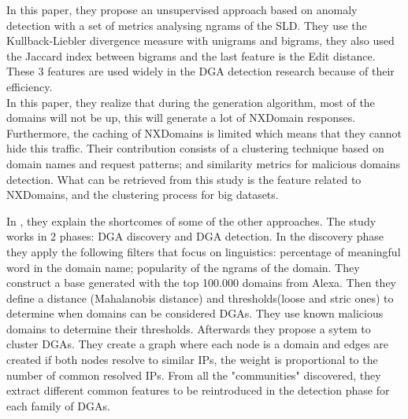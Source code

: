 In this paper\cite{dga3}, they propose an unsupervised approach based on anomaly detection with a set of metrics analysing ngrams of the SLD. They use the Kullback-Liebler divergence measure with unigrams and bigrams, they also used the Jaccard index between bigrams and the last feature is the Edit distance. These 3 features are used widely in the DGA detection research because of their efficiency. \\

In this paper\cite{dga4}, they realize that during the generation algorithm, most of the domains will not be up, this will generate a lot of NXDomain responses. Furthermore, the caching of NXDomains is limited which means that they cannot hide this traffic. Their contribution consists of a clustering technique based on domain names and request patterns; and similarity metrics for malicious domains detection. What can be retrieved from this study is the feature related to NXDomains, and the clustering process for big datasets.

In \cite{phoenix}, they explain the shortcomes of some of the other approaches. The study works in 2 phases: DGA discovery and DGA detection. In the discovery phase they apply the following filters that focus on linguistics: percentage of meaningful word in the domain name; popularity of the ngrams of the domain. They construct a base generated with the top 100.000 domains from Alexa. Then they define a distance (Mahalanobis distance) and thresholds(loose and stric ones) to determine when domains can be considered DGAs. They use known malicious domains to determine their thresholds. Afterwards they propose a sytem to cluster DGAs. They create a graph where each node is a domain and edges are created if both nodes resolve to similar IPs, the weight is proportional to the number of common resolved IPs. From all the "communities" discovered, they extract different common features to be reintroduced in the detection phase for each family of DGAs.
